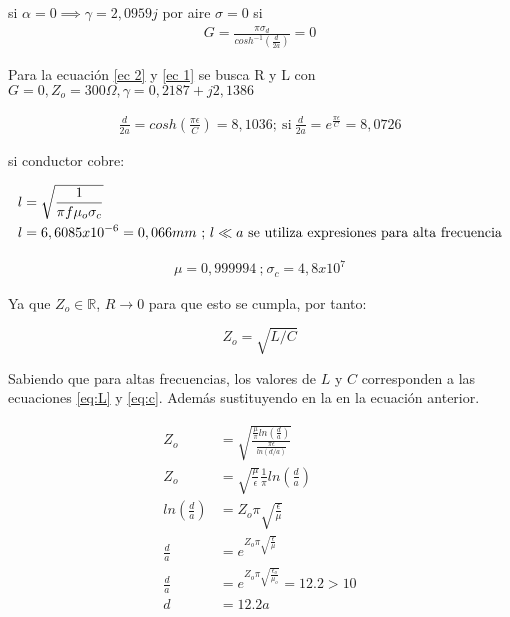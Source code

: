 si $\alpha = 0 \implies \gamma = 2,0959j$
por aire $\sigma = 0$
si 
\begin{align}
G = \frac{\pi \sigma_d}{cosh^{-1}\left(\frac{d}{2a}\right) } = 0
\end{align}

Para la ecuación \ref{ec 2} y  \ref{ec 1} se busca R y L con $G = 0, Z_o = 300 \Omega, \gamma= 0,2187 + j2,1386$

\begin{align}
    \frac{d}{2a} = cosh \left (  \frac{\pi \epsilon}{C} \right) = 8,1036 ; \ \text{si} \  \frac{d} {2a} = e^{\frac{\pi \epsilon}{C}} = 8,0726
\end{align}

si conductor cobre:

\begin{align}
    l &= \sqrt{\frac{1}{\pi f \mu_o \sigma_c}} \\
    l &= 6,6085x10^{-6} = 0,066mm \  \text{;} \  l \ll a \ \text{se utiliza expresiones para alta frecuencia} \notag
\end{align}

\begin{align*}
    \mu = 0,999994 \  \text{;} \ \sigma_c = 4,8x10^7
\end{align*}

Ya que $Z_o \in \mathbb{R}$, $R \rightarrow 0$ para que esto se cumpla, por tanto:

\begin{equation}
    Z_o = \sqrt{L/C}
\end{equation}

Sabiendo que para altas frecuencias, los valores de $L$ y $C$ corresponden a las ecuaciones \eqref{eq:L} y \eqref{eq:c}. Además sustituyendo en la en la ecuación anterior.

\begin{equation} \label{eq:d}
    \begin{split}
        Z_o &= \sqrt{\frac{\frac{\mu}{\pi}ln(\frac{d}{a})}{\frac{\pi \epsilon}{ln(d/a)}}} \\
        Z_o &= \sqrt{\frac{\mu}{\epsilon}} \frac{1}{\pi} ln(\frac{d}{a}) \\
        ln(\frac{d}{a}) &= Z_o \pi \sqrt{\frac{\epsilon}{\mu}} \\
        \frac{d}{a} &= e^{Z_o \pi \sqrt{\frac{\epsilon}{\mu}}} \\
        \frac{d}{a} &= e^{Z_o \pi \sqrt{\frac{\epsilon_o}{\mu_o}}} = 12.2 > 10 \\
        d&=12.2a \\
    \end{split}
\end{equation}

